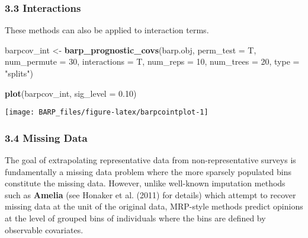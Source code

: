 \documentclass[]{article}
\newenvironment{Shaded}{\begin{snugshade}}{\end{snugshade}}
\newcommand{\KeywordTok}[1]{\textcolor[rgb]{0.13,0.29,0.53}{\textbf{#1}}}
\newcommand{\DataTypeTok}[1]{\textcolor[rgb]{0.13,0.29,0.53}{#1}}
\newcommand{\DecValTok}[1]{\textcolor[rgb]{0.00,0.00,0.81}{#1}}
\newcommand{\FloatTok}[1]{\textcolor[rgb]{0.00,0.00,0.81}{#1}}
\newcommand{\StringTok}[1]{\textcolor[rgb]{0.31,0.60,0.02}{#1}}
\newcommand{\NormalTok}[1]{#1}
\begin{document}
\subsubsection{3.3 Interactions}\label{interactions}

These methods can also be applied to interaction terms.

\begin{Shaded}
\begin{Highlighting}[]
\NormalTok{barpcov_int <-}\StringTok{ }\KeywordTok{barp_prognostic_covs}\NormalTok{(barp.obj,}
                                \DataTypeTok{perm_test =}\NormalTok{ T,}
                                \DataTypeTok{num_permute =} \DecValTok{30}\NormalTok{,}
                                \DataTypeTok{interactions =}\NormalTok{ T,}
                                \DataTypeTok{num_reps =} \DecValTok{10}\NormalTok{,}
                                \DataTypeTok{num_trees =} \DecValTok{20}\NormalTok{,}
                                \DataTypeTok{type =} \StringTok{"splits"}\NormalTok{)}
\end{Highlighting}
\end{Shaded}

\begin{Shaded}
\begin{Highlighting}[]
\KeywordTok{plot}\NormalTok{(barpcov_int,}
     \DataTypeTok{sig_level =} \FloatTok{0.10}\NormalTok{)}
\end{Highlighting}
\end{Shaded}

\begin{center}\texttt{[image: BARP\_files/figure-latex/barpcointplot-1]} \end{center}

\subsubsection{3.4 Missing Data}\label{missing-data}

The goal of extrapolating representative data from non-representative
surveys is fundamentally a missing data problem where the more sparsely
populated bins constitute the missing data. However, unlike well-known
imputation methods such as \textbf{Amelia} (see Honaker et al. (2011)
for details) which attempt to recover missing data at the unit of the
original data, MRP-style methods predict opinions at the level of
grouped bins of individuals where the bins are defined by observable
covariates.
\end{document}
